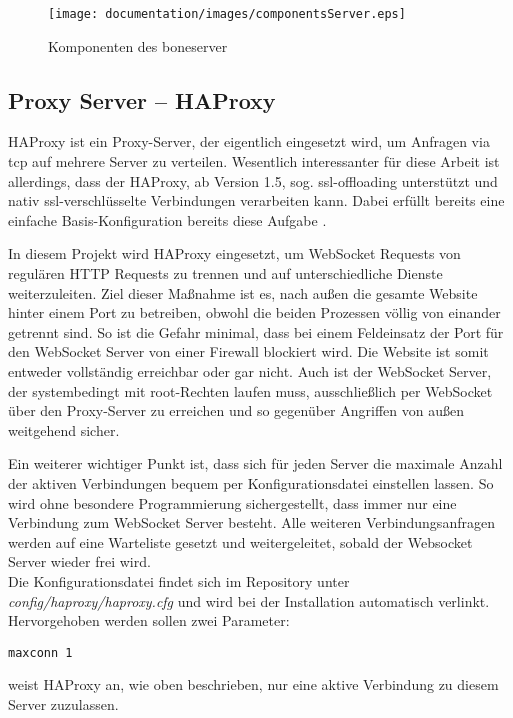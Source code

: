 \begin{figure}[ht]
  \centering
  \texttt{[image: documentation/images/componentsServer.eps]}
  \caption{Komponenten des boneserver}
  \label{fig:componentsServer}
\end{figure}


\subsection{Proxy Server -- HAProxy}
\label{subsec:HAProxy}
HAProxy ist ein Proxy-Server, der eigentlich eingesetzt wird, um Anfragen via \gls{tcp} auf mehrere Server zu verteilen. Wesentlich interessanter für diese Arbeit ist allerdings, dass der HAProxy, ab Version 1.5, sog. \gls{ssl-offloading} unterstützt und nativ \gls{ssl}-verschlüsselte Verbindungen verarbeiten kann. Dabei erfüllt bereits eine einfache Basis-Konfiguration bereits diese Aufgabe \cite{kuehnast2014}.

In diesem Projekt wird HAProxy eingesetzt, um WebSocket Requests von regulären HTTP Requests zu trennen und auf unterschiedliche Dienste weiterzuleiten. Ziel dieser Maßnahme ist es, nach außen die gesamte Website hinter einem Port zu betreiben, obwohl die beiden Prozessen völlig von einander getrennt sind. So ist die Gefahr minimal, dass bei einem Feldeinsatz der Port für den WebSocket Server von einer Firewall blockiert wird. Die Website ist somit entweder vollständig erreichbar oder gar nicht. Auch ist der WebSocket Server, der systembedingt mit root-Rechten laufen muss, ausschließlich per WebSocket über den Proxy-Server zu erreichen und so gegenüber Angriffen von außen weitgehend sicher.

Ein weiterer wichtiger Punkt ist, dass sich für jeden Server die maximale Anzahl der aktiven Verbindungen bequem per Konfigurationsdatei einstellen lassen. So wird ohne besondere Programmierung sichergestellt, dass immer nur eine Verbindung zum WebSocket Server besteht. Alle weiteren Verbindungsanfragen werden auf eine Warteliste gesetzt und weitergeleitet, sobald der Websocket Server wieder frei wird.\\

Die Konfigurationsdatei findet sich im Repository unter \textit{config/haproxy/haproxy.cfg} und wird bei der Installation automatisch verlinkt.
Hervorgehoben werden sollen zwei Parameter:

\begin{lstlisting}
maxconn 1
\end{lstlisting}
weist HAProxy an, wie oben beschrieben, nur eine aktive Verbindung zu diesem Server zuzulassen.

